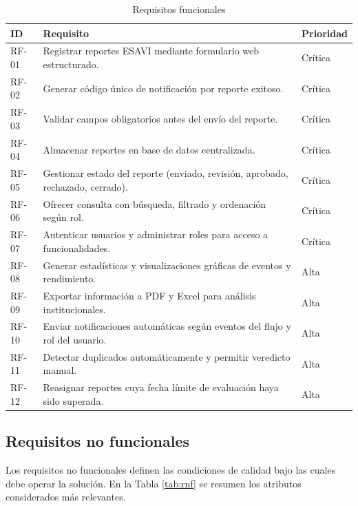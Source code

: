 \documentclass[12pt,letterpaper]{article}
\begin{document}
\begin{table}[H]
\centering
\caption{Requisitos funcionales}
\label{tab:rf}
\begin{tabular}{|l|p{8cm}|l|}
\hline
\textbf{ID} & \textbf{Requisito} & \textbf{Prioridad} \\[2pt] \hline
RF-01 & Registrar reportes ESAVI mediante formulario web estructurado. & Crítica \\ \hline
RF-02 & Generar código único de notificación por reporte exitoso. & Crítica \\ \hline
RF-03 & Validar campos obligatorios antes del envío del reporte. & Crítica \\ \hline
RF-04 & Almacenar reportes en base de datos centralizada. & Crítica \\ \hline
RF-05 & Gestionar estado del reporte (enviado, revisión, aprobado, rechazado, cerrado). & Crítica \\ \hline
RF-06 & Ofrecer consulta con búsqueda, filtrado y ordenación según rol. & Crítica \\ \hline
RF-07 & Autenticar usuarios y administrar roles para acceso a funcionalidades. & Crítica \\ \hline
RF-08 & Generar estadísticas y visualizaciones gráficas de eventos y rendimiento. & Alta \\ \hline
RF-09 & Exportar información a PDF y Excel para análisis institucionales. & Alta \\ \hline
RF-10 & Enviar notificaciones automáticas según eventos del flujo y rol del usuario. & Alta \\ \hline
RF-11 & Detectar duplicados automáticamente y permitir veredicto manual. & Alta \\ \hline
RF-12 & Reasignar reportes cuya fecha límite de evaluación haya sido superada. & Alta \\ \hline
\end{tabular}
\end{table}

\subsection{Requisitos no funcionales}

Los requisitos no funcionales definen las condiciones de calidad bajo las cuales debe operar la solución. 
En la Tabla \ref{tab:rnf} se resumen los atributos considerados más relevantes.
	
\end{document}
